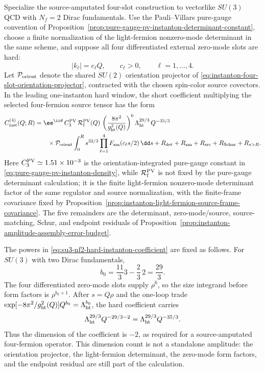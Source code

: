 \begin{controlledapproximation}
\label{ca:su3-two-flavor-hard-instanton-coefficient}
Specialize the source-amputated four-slot construction to vectorlike
\(SU(3)\) QCD with \(N_f=2\) Dirac fundamentals.  Use the Pauli--Villars
pure-gauge convention of
Proposition~\ref{prop:pure-gauge-pv-instanton-determinant-constant}, choose a
finite normalization of the light-fermion nonzero-mode determinant in the same
scheme, and suppose all four differentiated external zero-mode slots are hard:
\[
  |k_\ell|=c_\ell Q,\qquad c_\ell>0,\qquad \ell=1,\ldots,4 .
\]
Let \(\mathcal P_{\rm orient}\) denote the shared \(SU(2)\) orientation
projector of
\eqref{eq:instanton-four-slot-orientation-projector}, contracted with the
chosen spin-color source covectors.  In the leading one-instanton hard window,
the short coefficient multiplying the selected four-fermion source tensor has
the form
\begin{equation}
\begin{aligned}
  C^{(4)}_{\rm inst}(Q;R)
  &=
  \ee^{\ii\theta}\,
  C^{\rm PV}_{3}\,\mathcal R_{\rm f}^{\rm PV}(Q)\,
  \left(\frac{8\pi^2}{g_{\rm ht}^2(Q)}\right)^6
  \Lambda_{\rm ht}^{29/3}\,Q^{-35/3}        \\
  &\qquad{}\times
  \mathcal P_{\rm orient}
  \int_0^{R}
    s^{32/3}
    \prod_{\ell=1}^{4}F_{\rm zm}(c_\ell s/2)\,\dd s
  +R_{\rm det}+R_{\rm zm}+R_{\rm src}+R_{\rm Schur}+R_{s>R}.
\end{aligned}
  \label{eq:su3-nf2-hard-instanton-coefficient}
\end{equation}
Here \(C^{\rm PV}_{3}\simeq1.51\times10^{-3}\) is the orientation-integrated
pure-gauge constant in
\eqref{eq:pure-gauge-pv-instanton-density}, while
\(\mathcal R_{\rm f}^{\rm PV}\) is not fixed by the pure-gauge determinant
calculation; it is the finite light-fermion nonzero-mode determinant factor of
the same regulator and source normalization, with the finite-frame covariance
fixed by
Proposition~\ref{prop:instanton-light-fermion-source-frame-covariance}.  The
five remainders are the
determinant, zero-mode/source, source-matching, Schur, and endpoint residuals
of Proposition~\ref{prop:instanton-amplitude-assembly-error-budget}.

The powers in \eqref{eq:su3-nf2-hard-instanton-coefficient} are fixed as
follows.  For \(SU(3)\) with two Dirac fundamentals,
\[
  b_0=\frac{11}{3}3-\frac23\,2=\frac{29}{3}.
\]
The four differentiated zero-mode slots supply \(\rho^6\), so the size
integrand before form factors is \(\rho^{b_0+1}\).  After \(s=Q\rho\) and the
one-loop trade
\(\exp[-8\pi^2/g_{\rm ht}^2(Q)]Q^{b_0}=\Lambda_{\rm ht}^{b_0}\), the hard
coefficient carries
\[
  \Lambda_{\rm ht}^{29/3}Q^{-29/3-2}
  =
  \Lambda_{\rm ht}^{29/3}Q^{-35/3}.
\]
Thus the dimension of the coefficient is \(-2\), as required for a
source-amputated four-fermion operator.  This dimension count is not a
standalone amplitude: the orientation projector, the light-fermion determinant,
the zero-mode form factors, and the endpoint residual are still part of the
calculation.


\end{controlledapproximation}
